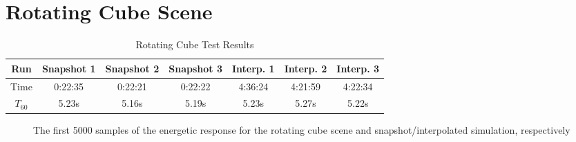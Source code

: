 \section{Rotating Cube Scene}

\begin{table}[t!]
    \centering
    \begin{tabular}{| c | c | c | c | c | c | c |}
        \hline
        Run        & Snapshot 1 & Snapshot 2 & Snapshot 3 & Interp. 1 & Interp. 2 & Interp. 3 \\
        \hline
        Time       & 0:22:35    & 0:22:21    & 0:22:22    & 4:36:24   & 4:21:59   & 4:22:34   \\
        \hline
        \(T_{60}\) & 5.23s      & 5.16s      & 5.19s      & 5.23s     & 5.27s     & 5.22s     \\
        \hline
    \end{tabular}
    \caption{Rotating Cube Test Results}\label{tbl:CubeSceneTable}
\end{table}

\begin{figure}[t!]
    \begin{center}
        
    \end{center}
    \caption{The first 5000 samples of the energetic response for the rotating cube scene and snapshot/interpolated simulation, respectively}\label{fig:CubeSceneIR}
\end{figure}

